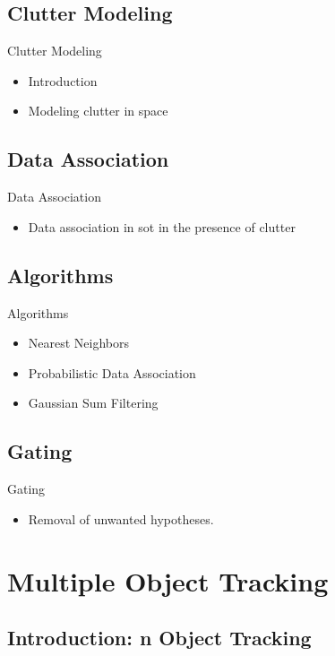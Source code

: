 \documentclass{beamer}
\begin{document}
	\subsection{Clutter Modeling}
	\begin{frame}{Clutter Modeling}
		\begin{itemize}
			\item Introduction
			\item Modeling clutter in space
		\end{itemize}
	\end{frame}
	\subsection{Data Association}
	\begin{frame}{Data Association}
		\begin{itemize}
			\item Data association in \gls{sot} in the presence of clutter
		\end{itemize}
	\end{frame}
	\subsection{Algorithms}
	\begin{frame}{Algorithms}
		\begin{itemize}
			\item Nearest Neighbors
			\item Probabilistic Data Association
			\item Gaussian Sum Filtering
		\end{itemize}
	\end{frame}
	\subsection{Gating}
	\begin{frame}{Gating}
		\begin{itemize}
			\item Removal of unwanted hypotheses.
		\end{itemize}
	\end{frame}
	\section{Multiple Object Tracking}
	\subsection{Introduction: n Object Tracking}
\end{document}
